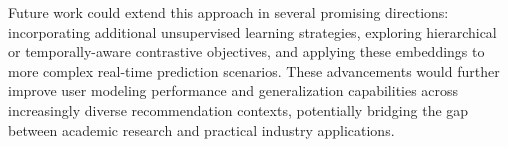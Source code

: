 \documentclass[sigconf]{acmart}
\begin{document}
Future work could extend this approach in several promising directions: incorporating additional unsupervised learning strategies, exploring hierarchical or temporally-aware contrastive objectives, and applying these embeddings to more complex real-time prediction scenarios. These advancements would further improve user modeling performance and generalization capabilities across increasingly diverse recommendation contexts, potentially bridging the gap between academic research and practical industry applications.


\end{document}
